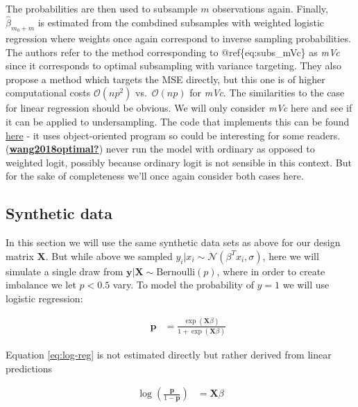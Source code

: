 \documentclass[
]{book}
\begin{document}
The probabilities are then used to subsample \(m\) observations again. Finally, \(\hat\beta_{m_0+m}\) is estimated from the combdined subsamples with weighted logistic regression where weights once again correspond to inverse sampling probabilities. The authors refer to the method corresponding to @ref\{eq:subs\_mVc\} as \emph{mVc} since it corresponds to optimal subsampling with variance targeting. They also propose a method which targets the MSE directly, but this one is of higher computational costs \(\mathcal{O}(np^2)\) vs.~\(\mathcal{O}(np)\) for \emph{mVc}. The similarities to the case for linear regression should be obvious. We will only consider \emph{mVc} here and see if it can be applied to undersampling. The code that implements this can be found \href{R/undersampling.R}{here} - it uses object-oriented program so could be interesting for some readers. (\protect\hyperlink{ref-wang2018optimal}{\textbf{wang2018optimal?}}) never run the model with ordinary as opposed to weighted logit, possibly because ordinary logit is not sensible in this context. But for the sake of completeness we'll once again consider both cases here.

\hypertarget{class-syn}{%
\subsection{Synthetic data}\label{class-syn}}

In this section we will use the same synthetic data sets as above for our design matrix \(\mathbf{X}\). But while above we sampled \(y_i |x_i\sim \mathcal{N}(\beta^T x_i,\sigma)\), here we will simulate a single draw from \(\mathbf{y} |\mathbf{X} \sim \text{Bernoulli}(p)\), where in order to create imbalance we let \(p<0.5\) vary. To model the probability of \(y=1\) we will use logistic regression:

\[
\begin{equation} 
\begin{aligned}
&& \mathbf{p}&= \frac{ \exp( \mathbf{X} \beta )}{1 + \exp(\mathbf{X} \beta)}
\end{aligned}
\label{eq:log-reg}
\end{equation}
\]

Equation \eqref{eq:log-reg} is not estimated directly but rather derived from linear predictions

\[
\begin{equation} 
\begin{aligned}
\log \left( \frac{\mathbf{p}}{1-\mathbf{p}} \right)&= \mathbf{X} \beta \\
\end{aligned}
\label{eq:lin-pred}
\end{equation}
\]
\end{document}
